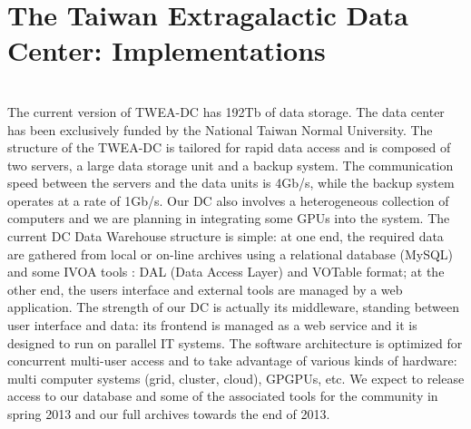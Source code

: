 \section{The Taiwan Extragalactic Data Center: Implementations}

\\
The current version of TWEA-DC has 192Tb of data storage. The data center has been exclusively funded by the National Taiwan Normal University.  The structure of the TWEA-DC is tailored for rapid data access and is composed of two servers, a large data storage unit and a backup system. The communication speed between the servers and the data units is 4Gb/s, while the backup system operates at a rate of 1Gb/s. Our DC also involves a heterogeneous collection of computers and we are planning in integrating some GPUs into the system. The current DC Data Warehouse structure is simple: at one end, the required data are gathered from local or on-line archives using a relational database (MySQL) and some IVOA tools : DAL (Data Access Layer) and VOTable format; at the other end, the users interface and external tools are managed by a web application. The strength of our DC is actually its middleware, standing between user interface and data: its frontend is managed as a web service and it is designed to run on parallel IT systems. The software architecture is optimized for concurrent multi-user access and to take advantage of various kinds of hardware: multi computer systems (grid, cluster, cloud), GPGPUs, etc. We expect to release access to our database and some of the associated tools for the community in spring 2013 and our full archives towards the end of 2013.\\

